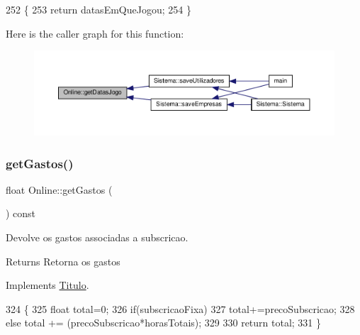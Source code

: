 \begin{DoxyCode}
252                                           \{
253     \textcolor{keywordflow}{return} datasEmQueJogou;
254 \}
\end{DoxyCode}
Here is the caller graph for this function\+:
\nopagebreak
\begin{figure}[H]
\begin{center}
\leavevmode
\includegraphics[width=350pt]{classOnline_aa6f51a948cb5ffd2c7cbac1f1cd6023f_icgraph}
\end{center}
\end{figure}
\mbox{\label{classOnline_ac3a2197523ee26effcacd9a2a9fe968e}} 
\subsubsection{\texorpdfstring{get\+Gastos()}{getGastos()}}
{\footnotesize\ttfamily float Online\+::get\+Gastos (\begin{DoxyParamCaption}{ }\end{DoxyParamCaption}) const\hspace{0.3cm}{\ttfamily [virtual]}}



Devolve os gastos associadas a subscricao. 

\begin{DoxyReturn}{Returns}
Retorna os gastos 
\end{DoxyReturn}


Implements \hyperlink{classTitulo_a9272448eec05cd9c026c54824bf2e727}{Titulo}.


\begin{DoxyCode}
324  \{
325      \textcolor{keywordtype}{float} total=0;
326      \textcolor{keywordflow}{if}(subscricaoFixa)
327          total+=precoSubscricao;
328      \textcolor{keywordflow}{else} total += (precoSubscricao*horasTotais);
329 
330      \textcolor{keywordflow}{return} total;
331  \}
\end{DoxyCode}
\mbox{\label{classOnline_ad0a23d2f1a2f804479ff346be0fdc686}} 
